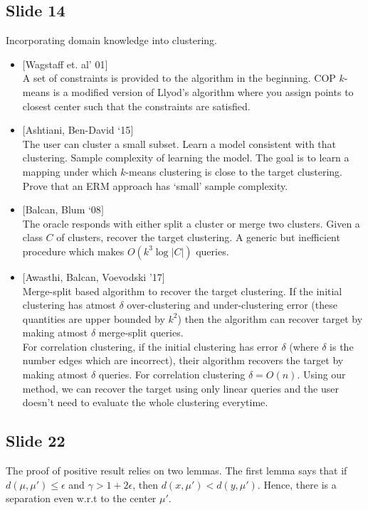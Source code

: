 \documentclass[12pt]{article}
\begin{document}
\subsection*{Slide 14}
Incorporating domain knowledge into clustering.
	\begin{itemize}
		\item $[$Wagstaff et. al' 01$]$\\
		A set of constraints is provided to the algorithm in the beginning. COP $k$-means is a modified version of Llyod's algorithm where you assign points to closest center such that the constraints are satisfied.
		\item $[$Ashtiani, Ben-David `15$]$\\
		The user can cluster a small subset. Learn a model consistent with that clustering. Sample complexity of learning the model. The goal is to learn a mapping under which $k$-means clustering is close to the target clustering. Prove that an ERM approach has `small' sample complexity.
		\item $[$Balcan, Blum `08$]$\\
		The oracle responds with either split a cluster or merge two clusters. Given a class $C$ of clusters, recover the target clustering. A generic but inefficient procedure which makes $O(k^3 \log |C|)$ queries.
		\item $[$Awasthi, Balcan, Voevodski '17$]$\\
		Merge-split based algorithm to recover the target clustering. If the initial clustering has atmost $\delta$ over-clustering and under-clustering error (these quantities are upper bounded by $k^2$) then the algorithm can recover target by making atmost $\delta$ merge-split queries. \\
		For correlation clustering, if the initial clustering has error $\delta$ (where $\delta$ is the number edges which are incorrect), their algorithm recovers the target by making atmost $\delta$ queries. For correlation clustering $\delta = O(n)$. Using our method, we can recover the target using only linear queries and the user doesn't need to evaluate the whole clustering everytime.
	\end{itemize}
\subsection*{Slide 22}
The proof of positive result relies on two lemmas. The first lemma says that if $d(\mu, \mu') \le \epsilon$ and $\gamma > 1 + 2\epsilon$, then $d(x, \mu') < d(y, \mu')$. Hence, there is a separation even w.r.t to the center $\mu'$.
\end{document}
